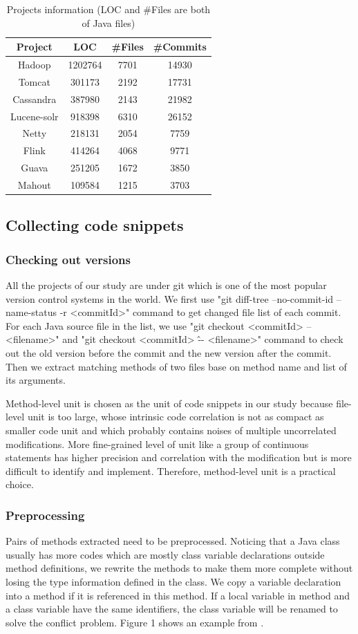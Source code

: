 \documentclass{sig-alternate-05-2015}
\begin{document}
\begin{table}
\centering
\caption{Projects information (LOC and \#Files are both of Java files)}
\begin{tabular}{|c|c|c|c|}\hline
Project&LOC&\#Files&\#Commits\\\hline
Hadoop&1202764&7701&14930\\\hline
Tomcat&301173&2192&17731\\\hline
Cassandra&387980&2143&21982\\\hline
Lucene-solr&918398&6310&26152\\\hline
Netty&218131&2054&7759\\\hline
Flink&414264&4068&9771\\\hline
Guava&251205&1672&3850\\\hline
Mahout&109584&1215&3703\\\hline
\end{tabular}
\end{table}

\subsection{Collecting code snippets}
\subsubsection{Checking out versions}
All the projects of our study are under git which is one of the most popular version control systems in the world. We first use "git diff-tree --no-commit-id --name-status -r <commitId>" command to get changed file list of each commit. For each Java source file in the list, we use "git checkout <commitId> -- <filename>" and "git checkout <commitId> \^ -- <filename>" command to check out the old version before the commit and the new version after the commit. Then we extract matching methods of two files base on method name and list of its arguments.

Method-level unit is chosen as the unit of code snippets in our study because file-level unit is too large, whose intrinsic code correlation is not as compact as smaller code unit and which probably contains noises of multiple uncorrelated modifications. More fine-grained level of unit like a group of continuous statements has higher precision and correlation with the modification but is more difficult to identify and implement. Therefore, method-level unit is a practical choice. 

\subsubsection{Preprocessing}
Pairs of methods extracted need to be preprocessed. Noticing that a Java class usually has more codes which are mostly class variable declarations outside method definitions, we rewrite the methods to make them more complete without losing the type information defined in the class. We copy a variable declaration into a method if it is referenced in this method. If a local variable in method and a class variable have the same identifiers, the class variable will be renamed to solve the conflict problem. Figure 1 shows an example from .
\end{document}
